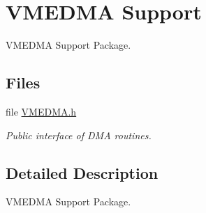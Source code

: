 \hypertarget{group__shared__vmedma}{}\section{V\+M\+E\+D\+MA Support}
\label{group__shared__vmedma}


V\+M\+E\+D\+MA Support Package.  


\subsection*{Files}
\begin{DoxyCompactItemize}
\item 
file \mbox{\hyperlink{VMEDMA_8h}{V\+M\+E\+D\+M\+A.\+h}}
\begin{DoxyCompactList}\small\item\em Public interface of D\+MA routines. \end{DoxyCompactList}\end{DoxyCompactItemize}


\subsection{Detailed Description}
V\+M\+E\+D\+MA Support Package. 

